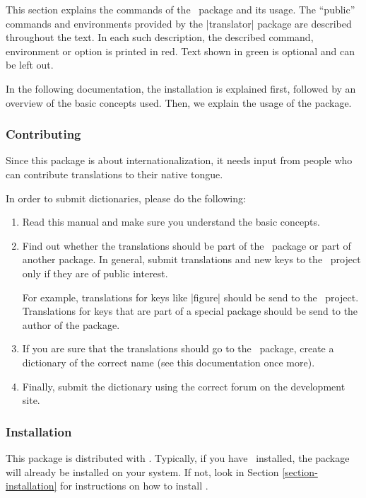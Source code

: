 This section explains the commands of the \translatorname\ package and its usage. The ``public'' commands and environments provided by the |translator| package are described throughout the text. In each such description, the described command, environment or option is printed in red. Text shown in green is optional and can be left out.

In the following documentation, the installation is explained first, followed by an overview of the basic concepts used. Then, we explain the usage of the package.

\subsubsection{Contributing}

Since this package is about internationalization, it needs input from people who can contribute translations to their native tongue.

In order to submit dictionaries, please do the following:
\begin{enumerate}
  \item Read this manual and make sure you understand the basic concepts.
  \item Find out whether the translations should be part of the \translatorname\ package or part of another package. In general, submit translations and new keys to the \translatorname\ project only if they are of public interest.

  For example, translations for keys like |figure| should be send to the \translatorname\ project. Translations for keys that are part of a special package should be send to the author of the package.
  \item If you are sure that the translations should go to the \translatorname\ package, create a dictionary of the correct name (see this documentation once more).
  \item Finally, submit the dictionary using the correct forum on the development site.
\end{enumerate}

\subsubsection{Installation}

This package is distributed with \beamer. Typically, if you have \beamer\ installed, the package will already be installed on your system. If not, look in Section \ref{section-installation} for instructions on how to install \beamer.



